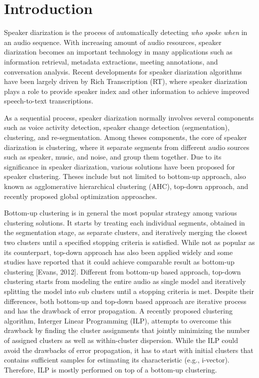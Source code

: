 \documentclass[final,authoryear,5p,times,twocolumn]{elsarticle}
\begin{document}

\section{Introduction}
Speaker diarization is the process of automatically detecting \textit{who spoke when }in an audio sequence. With increasing amount of audio resources, speaker diarization becomes an important technology in many applications such as information retrieval, metadata extractions, meeting annotations, and conversation analysis. Recent developments for speaker diarization algorithms have been largely driven by Rich Transcription (RT), where speaker diarization plays a role to provide speaker index and other information to achieve improved speech-to-text transcriptions.

As a sequential process, speaker diarization normally involves several components such as voice activity detection, speaker change detection (segmentation), clustering, and re-segmentation. Among theses components, the core of speaker diarization is clustering, where it separate segments from different audio sources such as speaker, music, and noise, and group them together. Due to its significance in speaker diarization, various solutions have been proposed for speaker clustering. Theses include but not limited to bottom-up approach, also known as agglomerative hierarchical clustering (AHC), top-down approach, and recently proposed global optimization approaches. 

Bottom-up clustering is in general the most popular strategy among various clustering solutions. It starts by treating each individual segments, obtained in the segmentation stage, as separate clusters, and iteratively merging the closest two clusters until a specified stopping criteria is satisfied. While not as popular as its counterpart, top-down approach has also been applied widely and some studies have reported that it could achieve comparable result as bottom-up clustering [Evans, 2012]. Different from bottom-up based approach, top-down clustering starts from modeling the entire audio as single model and iteratively splitting the model into sub clusters until a stopping criteria is met. Despite their differences, both bottom-up and top-down based approach are iterative process and has the drawback of error propagation. A recently proposed clustering algorithm, Interger Linear Programming (ILP), attempts to overcome this drawback by finding the cluster assignments that jointly minimizing the number of assigned clusters as well as within-cluster dispersion. While the ILP could avoid the drawbacks of error propagation, it has to start with initial clusters that contains sufficient samples for estimating its characteristic (e.g., i-vector). Therefore, ILP is mostly performed on top of a bottom-up clustering.
\end{document}
